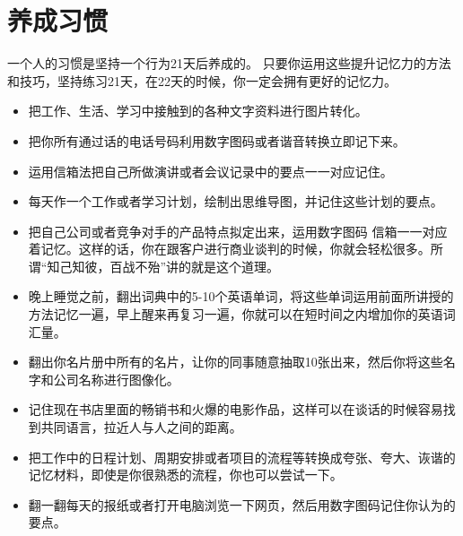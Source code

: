 
\chapter{养成习惯}


一个人的习惯是坚持一个行为21天后养成的。
只要你运用这些提升记忆力的方法和技巧，坚持练习21天，在22天的时候，你一定会拥有更好的记忆力。


\begin{itemize}
\item 把工作、生活、学习中接触到的各种文字资料进行图片转化。
\item 把你所有通过话的电话号码利用数字图码或者谐音转换立即记下来。
\item 运用信箱法把自己所做演讲或者会议记录中的要点一一对应记住。
\item 每天作一个工作或者学习计划，绘制出思维导图，并记住这些计划的要点。
\item 把自己公司或者竞争对手的产品特点拟定出来，运用数字图码 信箱一一对应着记忆。这样的话，你在跟客户进行商业谈判的时候，你就会轻松很多。所谓“知己知彼，百战不殆”讲的就是这个道理。
\item 晚上睡觉之前，翻出词典中的5-10个英语单词，将这些单词运用前面所讲授的方法记忆一遍，早上醒来再复习一遍，你就可以在短时间之内增加你的英语词汇量。
\item 翻出你名片册中所有的名片，让你的同事随意抽取10张出来，然后你将这些名字和公司名称进行图像化。
\item 记住现在书店里面的畅销书和火爆的电影作品，这样可以在谈话的时候容易找到共同语言，拉近人与人之间的距离。
\item 把工作中的日程计划、周期安排或者项目的流程等转换成夸张、夸大、诙谐的记忆材料，即使是你很熟悉的流程，你也可以尝试一下。
\item 翻一翻每天的报纸或者打开电脑浏览一下网页，然后用数字图码记住你认为的要点。
\end{itemize}


